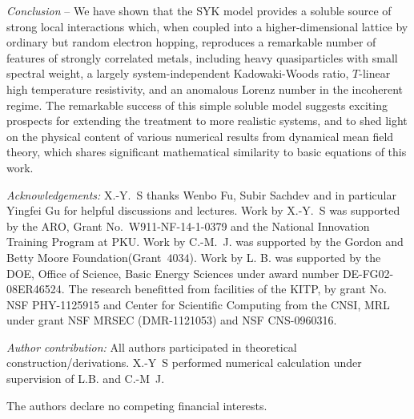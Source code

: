 \documentclass[twocolumn,floatfix,superscriptaddress]{revtex4-1}
\begin{document}
\emph{Conclusion} -- We have shown that the SYK model provides a soluble source of strong local interactions which, when coupled into a higher-dimensional lattice by ordinary but random electron hopping, reproduces a remarkable number of features of strongly correlated metals, including heavy quasiparticles with small spectral weight, a largely system-independent Kadowaki-Woods ratio, $T$-linear high temperature resistivity, and an anomalous Lorenz number in the incoherent regime.  The remarkable success of this simple soluble model suggests exciting prospects for extending the treatment to more realistic systems, and to shed light on the physical content of various numerical results from dynamical mean field theory\cite{georges_1996}, which shares significant mathematical similarity to basic equations of this work.  

 \emph {Acknowledgements:}  X.-Y.~S thanks Wenbo Fu, Subir Sachdev and in particular Yingfei Gu for helpful discussions and lectures.  Work by X.-Y.~S was supported by the ARO, Grant No.~W911-NF-14-1-0379 and the National Innovation Training Program at PKU.  Work by C.-M.~J. was supported by the Gordon and Betty Moore Foundation(Grant~$4034$).  Work by L. B. was supported by the DOE, Office of Science, Basic Energy Sciences under award number DE-FG02-08ER46524.  The research benefitted from facilities of the KITP, by grant No. NSF PHY-1125915 and Center for Scientific Computing from the CNSI, MRL under grant NSF MRSEC (DMR-1121053) and NSF CNS-0960316. 
 
 \emph{Author contribution:} All authors participated in theoretical construction/derivations. X.-Y~S performed numerical calculation under supervision of L.B. and C.-M~J.
 
 The authors declare no competing financial interests.


 \appendix
 \renewcommand{\appendixname}{}
\end{document}
